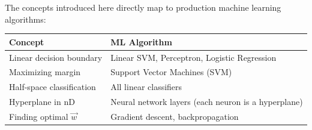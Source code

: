 \documentclass[12pt,a4paper]{article}
\theoremstyle{directpoint}
\theoremstyle{definition}
\begin{document}
The concepts introduced here directly map to production machine learning algorithms:

\begin{center}
\begin{tabular}{|p{4cm}|p{10cm}|}
\hline
\textbf{Concept} & \textbf{ML Algorithm} \\
\hline
Linear decision boundary & Linear SVM, Perceptron, Logistic Regression \\
\hline
Maximizing margin & Support Vector Machines (SVM) \\
\hline
Half-space classification & All linear classifiers \\
\hline
Hyperplane in nD & Neural network layers (each neuron is a hyperplane) \\
\hline
Finding optimal $\vec{w}$ & Gradient descent, backpropagation \\
\hline
\end{tabular}
\end{center}
\end{document}
